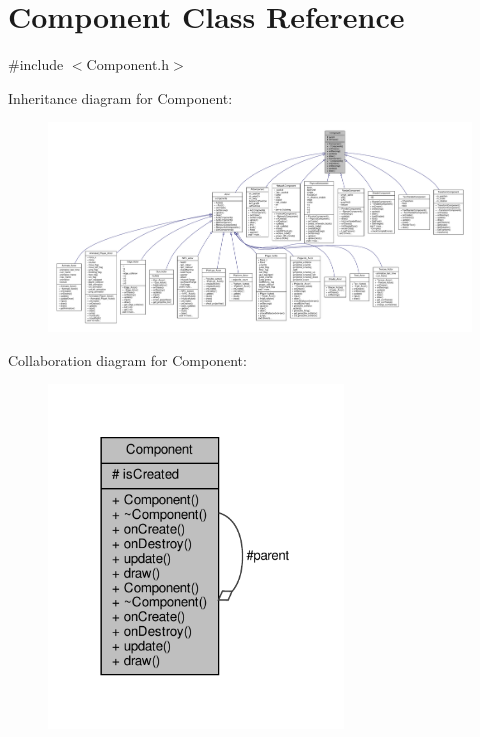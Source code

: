 \hypertarget{classComponent}{}\section{Component Class Reference}
\label{classComponent}


{\ttfamily \#include $<$Component.\+h$>$}



Inheritance diagram for Component\+:
\nopagebreak
\begin{figure}[H]
\begin{center}
\leavevmode
\includegraphics[width=350pt]{classComponent__inherit__graph}
\end{center}
\end{figure}


Collaboration diagram for Component\+:
\nopagebreak
\begin{figure}[H]
\begin{center}
\leavevmode
\includegraphics[width=222pt]{classComponent__coll__graph}
\end{center}
\end{figure}
